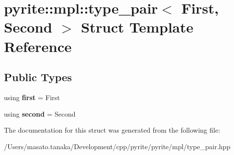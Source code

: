 \hypertarget{structpyrite_1_1mpl_1_1type__pair}{}\section{pyrite\+:\+:mpl\+:\+:type\+\_\+pair$<$ First, Second $>$ Struct Template Reference}
\label{structpyrite_1_1mpl_1_1type__pair}
\subsection*{Public Types}
\begin{DoxyCompactItemize}
\item 
\mbox{\label{structpyrite_1_1mpl_1_1type__pair_ab8c506211d061b54d06da4abb8f6bf32}} 
using {\bfseries first} = First
\item 
\mbox{\label{structpyrite_1_1mpl_1_1type__pair_a7f44105554b3a76114e982fe3ba247fa}} 
using {\bfseries second} = Second
\end{DoxyCompactItemize}


The documentation for this struct was generated from the following file\+:\begin{DoxyCompactItemize}
\item 
/\+Users/masato.\+tanaka/\+Development/cpp/pyrite/pyrite/mpl/type\+\_\+pair.\+hpp\end{DoxyCompactItemize}
